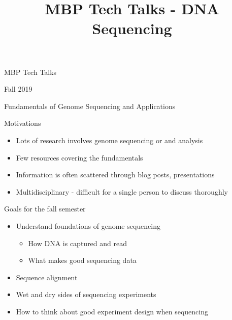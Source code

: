 \documentclass[
  ignorenonframetext,
]{beamer}
\title{MBP Tech Talks - DNA Sequencing}
\date{}
\providecommand{\tightlist}{%
  \setlength{\itemsep}{0pt}\setlength{\parskip}{0pt}}
\begin{document}
\frame{\titlepage}

\begin{frame}

\end{frame}

\begin{frame}{MBP Tech Talks}
\protect\hypertarget{mbp-tech-talks}{}

\begin{block}{Fall 2019}

Fundamentals of Genome Sequencing and Applications

\end{block}

\end{frame}

\begin{frame}{Motivations}
\protect\hypertarget{motivations}{}

\begin{itemize}
\tightlist
\item
  Lots of research involves genome sequencing or and analysis
\item
  Few resources covering the fundamentals
\item
  Information is often scattered through blog posts, presentations
\item
  Multidisciplinary - difficult for a single person to discuss
  thoroughly
\end{itemize}

\end{frame}

\begin{frame}{Goals for the fall semester}
\protect\hypertarget{goals-for-the-fall-semester}{}

\begin{itemize}
\tightlist
\item
  Understand foundations of genome sequencing

  \begin{itemize}
  \tightlist
  \item
    How DNA is captured and read
  \item
    What makes good sequencing data
  \end{itemize}
\item
  Sequence alignment
\item
  Wet and dry sides of sequencing experiments
\item
  How to think about good experiment design when sequencing
\end{itemize}

\end{frame}
\end{document}
